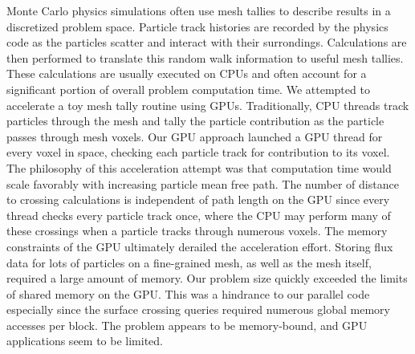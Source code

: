 \abstract
Monte Carlo physics simulations often use mesh tallies to describe results in a
discretized problem space. Particle track histories are recorded by the physics
code as the particles scatter and interact with their surrondings. Calculations
are then performed to translate this random walk information to useful mesh
tallies. These calculations are usually executed on CPUs and often account for a
significant portion of overall problem computation time. We attempted to
accelerate a toy mesh tally routine using GPUs. Traditionally, CPU threads track
particles through the mesh and tally the particle contribution as the particle
passes through mesh voxels. Our GPU approach launched a GPU thread for every
voxel in space, checking each particle track for contribution to its voxel.
The philosophy of this acceleration attempt was that computation time would scale
favorably with increasing particle mean free path. The number of distance to crossing
calculations is independent of path length on the GPU since every thread checks
every particle track once, where the CPU may perform many of these crossings
when a particle tracks through numerous voxels. The memory constraints of the
GPU ultimately derailed the acceleration effort. Storing flux data for lots of
particles on a fine-grained mesh, as well as the mesh itself, required a large amount of memory. 
Our problem size quickly exceeded the limits of shared memory on the GPU. This was a
hindrance to our parallel code especially since the surface crossing queries
required numerous global memory accesses per block. The problem appears to be
memory-bound, and GPU applications seem to be limited.

